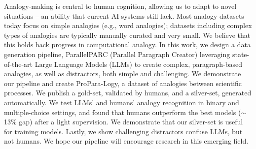 Analogy-making is central to human cognition, allowing us to adapt to novel situations – an ability that current AI systems still lack.  Most analogy datasets today focus on simple analogies (e.g., word analogies); datasets including complex types of analogies are typically manually curated and very small. We believe that this holds back progress in computational analogy. In this work, we design a data generation pipeline, ParallelPARC (Parallel Paragraph Creator) leveraging state-of-the-art Large Language Models (LLMs) to create complex, paragraph-based analogies, as well as distractors, both simple and challenging. We demonstrate our pipeline and create ProPara-Logy, a dataset of analogies between scientific processes. We publish a gold-set, validated by humans, and a silver-set, generated automatically. We test LLMs’ and humans’ analogy recognition in binary and multiple-choice settings, and found that humans outperform the best models ($\sim$13\% gap) after a light supervision. We demonstrate that our silver-set is useful for training models. Lastly, we show challenging distractors confuse LLMs, but not humans. We hope our pipeline will encourage research in this emerging field.